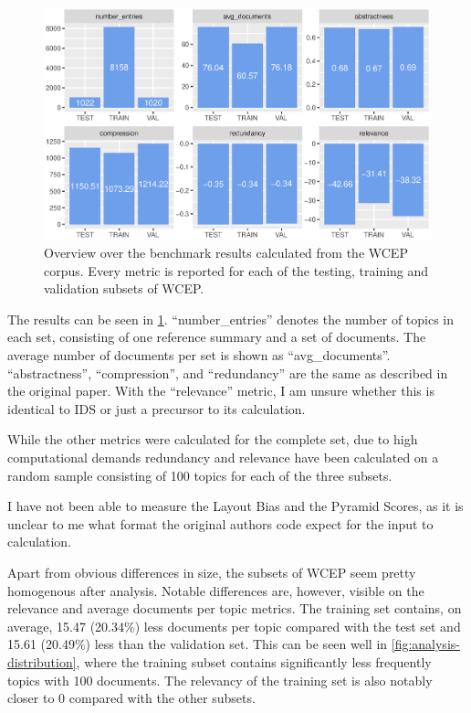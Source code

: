 \documentclass[../main.tex]{subfiles}
\begin{document}
\begin{figure}
    \includegraphics[width=\textwidth]{figures/analysis.eps}
    \caption{Overview over the benchmark results calculated from the WCEP corpus. Every metric is reported for each of the testing, training and validation subsets of WCEP.} \label{fig:analysis}
\end{figure}

The results can be seen in \ref{fig:analysis}. \enquote{number\_entries} denotes the number of topics in each set, consisting of one reference summary and a set of documents.
The average number of documents per set is shown as \enquote{avg\_documents}. \enquote{abstractness}, \enquote{compression}, and \enquote{redundancy} are the same as described in the original paper.
With the \enquote{relevance} metric, I am unsure whether this is identical to IDS or just a precursor to its calculation.

While the other metrics were calculated for the complete set, due to high computational demands redundancy and relevance have been calculated on a random sample consisting of 100 topics for each of the three subsets.

I have not been able to measure the Layout Bias and the Pyramid Scores, as it is unclear to me what format the original authors code expect for the input to calculation.

Apart from obvious differences in size, the subsets of WCEP seem pretty homogenous after analysis.
Notable differences are, however, visible on the relevance and average documents per topic metrics.
The training set contains, on average, 15.47 (20.34\%) less documents per topic compared with the test set and 15.61 (20.49\%) less than the validation set.
This can be seen well in \ref{fig:analysis-distribution}, where the training subset contains significantly less frequently topics with 100 documents.
The relevancy of the training set is also notably closer to 0 compared with the other subsets.
\end{document}
